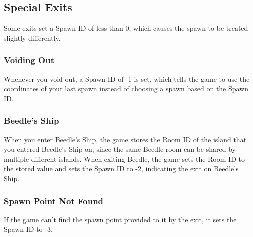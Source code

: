 \documentclass[titlepage,12pt,a4paper]{article}
\begin{document}
\subsection{Special Exits}
Some exits set a Spawn ID of less than 0, which causes the spawn to be treated slightly differently.

\subsubsection{Voiding Out}
Whenever you void out, a Spawn ID of -1 is set, which tells the game to use the coordinates of your last spawn instead of choosing a spawn based on the Spawn ID.

\subsubsection{Beedle’s Ship}
When you enter Beedle’s Ship, the game stores the Room ID of the island that you entered Beedle’s Ship on, since the same Beedle room can be shared by multiple different islands. When exiting Beedle, the game sets the Room ID to the stored value and sets the Spawn ID to -2, indicating the exit on Beedle’s Ship.

\subsubsection{Spawn Point Not Found}
If the game can't find the spawn point provided to it by the exit, it sets the Spawn ID to -3.
\end{document}
